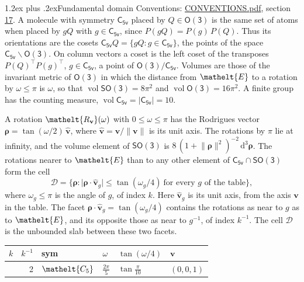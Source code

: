 \documentclass[10pt,a4paper]{article}
\makeatletter
\renewcommand\section{\@startsection{section}{1}{\z@}{-3ex plus -1ex minus -.2ex}%
  {1.2ex plus .2ex}{\normalfont\large\sffamily\bfseries\color{parttitle}}}
\numberwithin{equation}{section}
\newcommand{\eltfont}[1]{{\let\sigma\eltsigma\mathelt{#1}}}
\newcommand{\grp}[1]{\mathsf{#1}}
\newcommand{\cls}[1]{\eltfont{#1}}
\newcommand{\elt}[1]{\eltfont{#1}}
\newcommand{\dirvec}[3]{(#1, #2, #3)}
\newcommand{\unitaxis}{\hat{\mathbf{v}}}
\newcommand{\vv}{\mathbf{v}}
\newcommand{\diff}{\mathrm{d}}
\newcommand{\vol}{\operatorname{vol}}
\newcommand{\rodrigues}{\boldsymbol{\rho}}
\newcommand{\fcell}{\mathcal{D}}
\makeatother
\begin{document}
\section{Fundamental domain}\label{s:fundamental_domain}
Conventions: \href{../../CONVENTIONS.pdf}{CONVENTIONS.pdf}, section \href{../../CONVENTIONS.pdf\#conv.17}{17}.
\leavevmode\label{n:element.placement}A molecule with symmetry $\grp{C_{5v}}$ placed by $Q \in \grp{O(3)}$ is the same set of atoms when placed by $gQ$ with $g \in \grp{C_{5v}}$, since $P(gQ) = P(g)\,P(Q)$. \label{n:operator.cosets}Thus its orientations are the cosets $\grp{C_{5v}}Q = \{gQ : g \in \grp{C_{5v}}\}$, the points of the space $\grp{C_{5v}}\backslash\grp{O(3)}$. On column vectors a coset is the left coset of the transposes $P(Q)^{\top}P(g)^{\top}$, $g \in \grp{C_{5v}}$, a point of $\grp{O(3)}/\grp{C_{5v}}$.
\leavevmode\label{n:operator.volume}Volumes are those of the invariant metric of \href{O3.pdf}{$\grp{O(3)}$} in which the distance from $\elt{E}$ to a rotation by $\omega \le \pi$ is $\omega$, so that $\vol\grp{SO(3)} = 8\pi^2$ and $\vol\grp{O(3)} = 16\pi^2$. A finite group has the counting measure, $\vol\grp{C_{5v}} = |\grp{C_{5v}}| = 10$.

\leavevmode\label{n:vector.rodrigues}\label{n:vector.unitaxis}A rotation $\elt{R_{\vv}}(\omega)$ with $0 \le \omega \le \pi$ has the Rodrigues vector $\rodrigues = \tan(\omega/2)\,\unitaxis$, where $\unitaxis = \vv/\lVert\vv\rVert$ is its unit axis. The rotations by $\pi$ lie at infinity, and the volume element of \href{SO3.pdf}{$\grp{SO(3)}$} is $8\,(1 + \lVert\rodrigues\rVert^2)^{-2}\,\diff^3\rodrigues$.
\leavevmode\label{n:set.cell}The rotations nearer to $\elt{E}$ than to any other element of $\grp{C_{5v}} \cap \grp{SO(3)}$ form the cell
\begin{equation}\label{e:cell}\fcell = \bigl\{\rodrigues : \lvert\rodrigues\cdot\unitaxis_g\rvert \le \tan(\omega_g/4)\ \text{for every $g$ of the table}\bigr\},\end{equation}
where $\omega_g \le \pi$ is the angle of $g$, of index $k$. Here $\unitaxis_g$ is its unit axis, from the axis $\vv$ in the table. The facet $\rodrigues\cdot\unitaxis_g = \tan(\omega_g/4)$ contains the rotations as near to $g$ as to $\elt{E}$, and its opposite those as near to $g^{-1}$, of index $k^{-1}$. The cell $\fcell$ is the unbounded slab between these two facets.
{\small{\renewcommand{\arraystretch}{1.3}\begin{longtable}{@{}rrllll@{}}\toprule
$k$ & $k^{-1}$ & sym & $\omega$ & $\tan(\omega/4)$ & $\vv$\\\midrule\endhead
\bottomrule\endfoot\endlastfoot
1 & 2 & $\cls{C_{5}}$ & $\tfrac{2\pi}{5}$ & $\tan\tfrac{\pi}{10}$ & $\dirvec{0}{0}{1}$\\
\bottomrule\end{longtable}}}
\end{document}
